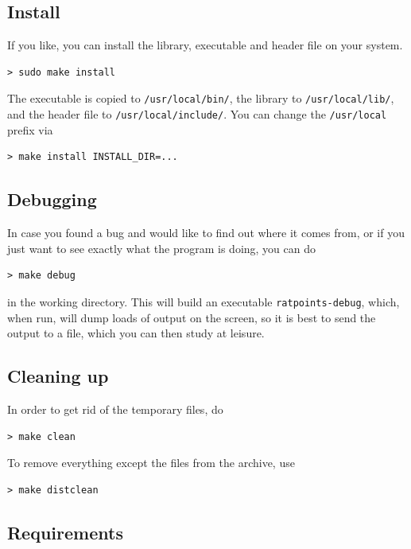 \documentclass[12pt,a4paper,oneside]{amsart}
\begin{document}
\subsection{Install}

If you like, you can install the library, executable and header file
on your system.

\begin{verbatim}
> sudo make install
\end{verbatim}

The executable is copied to \texttt{/usr/local/bin/}, the
library to \texttt{/usr/local/lib/}, and the header file to
\texttt{/usr/local/include/}. You can change the \texttt{/usr/local} prefix
via
\begin{verbatim}
> make install INSTALL_DIR=...
\end{verbatim}

\subsection{Debugging}

In case you found a bug and would like to find out where it comes from,
or if you just want to see exactly what the program is doing, you can
do

\begin{verbatim}
> make debug
\end{verbatim}

in the working directory. This will build an executable \texttt{ratpoints-debug},
which, when run, will dump loads of output on the screen, so it is best
to send the output to a file, which you can then study at leisure.

\subsection{Cleaning up}

In order to get rid of the temporary files, do

\begin{verbatim}
> make clean
\end{verbatim}

To remove everything except the files from the archive, use

\begin{verbatim}
> make distclean
\end{verbatim}

\subsection{Requirements}
\end{document}
